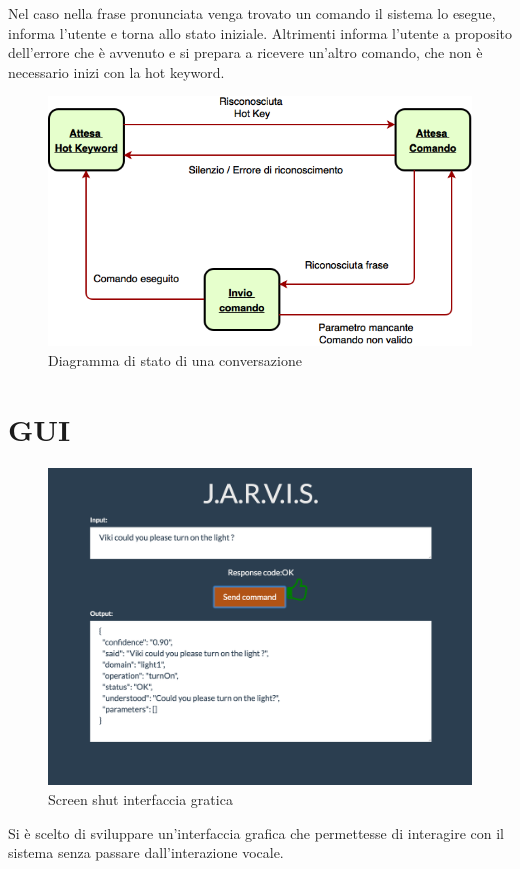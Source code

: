 \documentclass[twoside]{supsistudent}
\begin{document}
Nel caso nella frase pronunciata venga trovato un comando il sistema lo esegue, informa l'utente e torna allo stato iniziale.
Altrimenti informa l'utente a proposito dell'errore che è avvenuto e si prepara a ricevere un'altro comando, che non è necessario inizi con la hot keyword.
\begin{figure}[H]
\centering
\includegraphics[width=\textwidth]{Conversation}
\caption{Diagramma di stato di una conversazione}
\label{fig:pose}
\end{figure}
\chapter{GUI}
\begin{figure}[H]
\centering
\includegraphics[width=\textwidth]{Gui}
\caption{Screen shut interfaccia gratica}
\label{fig:pose}
\end{figure}
Si è scelto di sviluppare un'interfaccia grafica che permettesse di interagire con il sistema senza passare dall'interazione vocale.
\end{document}
